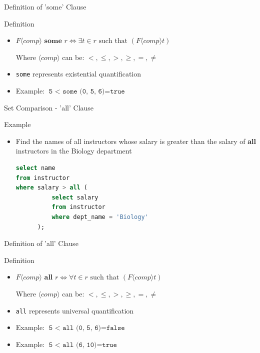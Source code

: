 \documentclass[aspectratio=169, xcolor=dvipsnames]{beamer}
\begin{document}
\begin{frame}{Definition of 'some' Clause}
    \begin{block}{Definition}
        \begin{itemize}[<+->]
            \item $F \langle comp \rangle \textbf{ some } r \Leftrightarrow \exists t \in r \text{ such that } (F \langle comp \rangle t)$
            \vspace{0.5em}
            
            Where $\langle comp \rangle$ can be: $<, \le, >, \ge, =, \neq$
            \vspace{1em}
            \item \texttt{some} represents existential quantification
            \item Example: $\texttt{5 < some (0, 5, 6)} = \texttt{true}$
        \end{itemize}
    \end{block}
\end{frame}

\begin{frame}[fragile]{Set Comparison - 'all' Clause}
    \begin{exampleblock}{Example}
        \begin{itemize}[<+->]
            \item Find the names of all instructors whose salary is greater than the salary of \textbf{all} instructors in the Biology department
            \begin{lstlisting}[language=SQL]
select name 
from instructor 
where salary > all ( 
          select salary 
          from instructor 
          where dept_name = 'Biology' 
      );
            \end{lstlisting}
        \end{itemize}
    \end{exampleblock}
\end{frame}

\begin{frame}{Definition of 'all' Clause}
    \begin{block}{Definition}
        \begin{itemize}[<+->]
            \item $F \langle comp \rangle \textbf{ all } r \Leftrightarrow \forall t \in r \text{ such that } (F \langle comp \rangle t)$
            \vspace{0.5em}
            
            Where $\langle comp \rangle$ can be: $<, \le, >, \ge, =, \neq$
            \vspace{1em}
            \item \texttt{all} represents universal quantification
            \item Example: $\texttt{5 < all (0, 5, 6)} = \texttt{false}$
            \item Example: $\texttt{5 < all (6, 10)} = \texttt{true}$
        \end{itemize}
    \end{block}
\end{frame}
\end{document}

